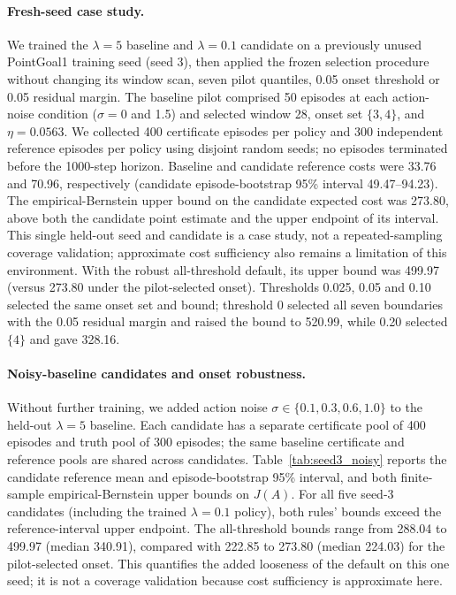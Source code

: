 \documentclass{article}
\begin{document}
\paragraph{Fresh-seed case study.} We trained the $\lambda=5$ baseline and $\lambda=0.1$ candidate on a previously unused PointGoal1 training seed (seed 3), then applied the frozen selection procedure without changing its window scan, seven pilot quantiles, 0.05 onset threshold or 0.05 residual margin. The baseline pilot comprised 50 episodes at each action-noise condition ($\sigma=0$ and 1.5) and selected window 28, onset set $\{3,4\}$, and $\eta=0.0563$. We collected 400 certificate episodes per policy and 300 independent reference episodes per policy using disjoint random seeds; no episodes terminated before the 1000-step horizon. Baseline and candidate reference costs were 33.76 and 70.96, respectively (candidate episode-bootstrap 95\% interval 49.47--94.23). The empirical-Bernstein upper bound on the candidate expected cost was 273.80, above both the candidate point estimate and the upper endpoint of its interval. This single held-out seed and candidate is a case study, not a repeated-sampling coverage validation; approximate cost sufficiency also remains a limitation of this environment. With the robust all-threshold default, its upper bound was 499.97 (versus 273.80 under the pilot-selected onset). Thresholds 0.025, 0.05 and 0.10 selected the same onset set and bound; threshold 0 selected all seven boundaries with the 0.05 residual margin and raised the bound to 520.99, while 0.20 selected $\{4\}$ and gave 328.16.

\paragraph{Noisy-baseline candidates and onset robustness.} Without further training, we added action noise $\sigma\in\{0.1,0.3,0.6,1.0\}$ to the held-out $\lambda=5$ baseline. Each candidate has a separate certificate pool of 400 episodes and truth pool of 300 episodes; the same baseline certificate and reference pools are shared across candidates. Table~\ref{tab:seed3_noisy} reports the candidate reference mean and episode-bootstrap 95\% interval, and both finite-sample empirical-Bernstein upper bounds on $J(A)$. For all five seed-3 candidates (including the trained $\lambda=0.1$ policy), both rules' bounds exceed the reference-interval upper endpoint. The all-threshold bounds range from 288.04 to 499.97 (median 340.91), compared with 222.85 to 273.80 (median 224.03) for the pilot-selected onset. This quantifies the added looseness of the default on this one seed; it is not a coverage validation because cost sufficiency is approximate here.
\end{document}

